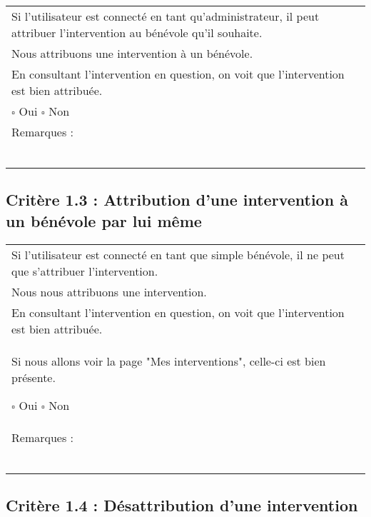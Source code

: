 		\begin{center}
    	 		\begin{tabular}[h]{|p{}|}
			\hline
				Si l’utilisateur est connecté en tant qu’administrateur, il peut attribuer l’intervention au
bénévole qu’il souhaite.\\
Nous attribuons une intervention à un bénévole.\\
En consultant l’intervention en question, on voit que l’intervention est bien attribuée.\\
				
				$\square$ Oui \hfill \hfill $\square$ Non \\\hline Remarques : \\ ~\\
			 \\\hline
     		\end{tabular}
  		\end{center}	

	\subsection*{Critère 1.3 : Attribution d’une intervention à un bénévole par lui même}
	
		\begin{center}
    	 		\begin{tabular}[h]{|p{}|}
			\hline
				Si l’utilisateur est connecté en tant que simple bénévole, il ne peut que s’attribuer l’intervention.\\
Nous nous attribuons une intervention.\\
En consultant l’intervention en question, on voit que l’intervention est bien attribuée.\\
Si nous allons voir la page "Mes interventions", celle-ci est bien présente.
				
				$\square$ Oui \hfill \hfill $\square$ Non \\\hline Remarques : \\ ~\\
			 \\\hline
     		\end{tabular}
  		\end{center}	

	\subsection*{Critère 1.4 : Désattribution d’une intervention}
	
